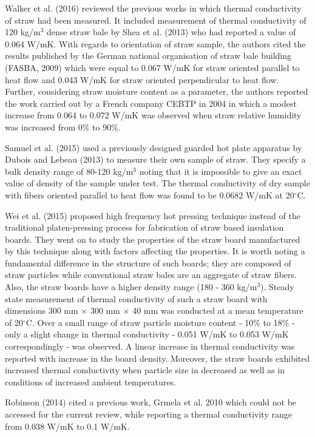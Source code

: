\documentclass[12pt]{report}
\begin{document}
 Walker et al. (2016) reviewed the previous works in which thermal
conductivity of straw had been measured. It included measurement of
thermal conductivity of 120 kg/m\(^{3}\) dense straw bale by Shea et al.
(2013) who had reported a value of 0.064 W/mK. With regards to
orientation of straw sample, the authors cited the results published by
the German national organisation of straw bale building (FASBA, 2009)
which were equal to 0.067 W/mK for straw oriented parallel to heat flow
and 0.043 W/mK for straw oriented perpendicular to heat flow. Further,
considering straw moisture content as a parameter, the authors reported
the work carried out by a French company CEBTP in 2004 in which a modest
increase from 0.064 to 0.072 W/mK was observed when straw relative
humidity was increased from 0\% to 90\%.

 Samuel et al. (2015) used a previously designed guarded hot plate
apparatus by Dubois and Lebeau (2013) to measure their own sample of
straw. They specify a bulk density range of 80-120 kg/m\(^{3}\) noting
that it is impossible to give an exact value of density of the sample
under test. The thermal conductivity of dry sample with fibers oriented
parallel to heat flow was found to be 0.0682 W/mK at 20\(^{\circ}\)C.

 Wei et al. (2015) proposed high frequency hot pressing technique
instead of the traditional platen-pressing process for fabrication of
straw based insulation boards. They went on to study the properties of
the straw board manufactured by this technique along with factors
affecting the properties. It is worth noting a fundamental difference in
the structure of such boards; they are composed of straw particles while
conventional straw bales are an aggregate of straw fibers. Also, the
straw boards have a higher density range (180 - 360 kg/m\(^{3}\)).
Steady state measurement of thermal conductivity of such a straw board
with dimensions 300 mm \(\times\) 300 mm \(\times\) 40 mm was conducted
at a mean temperature of 20\(^{\circ}\)C. Over a small range of straw
particle moisture content - 10\% to 18\% - only a slight change in
thermal conductivity - 0.051 W/mK to 0.053 W/mK correspondingly - was
observed. A linear increase in thermal conductivity was reported with
increase in the board density. Moreover, the straw boards exhibited
increased thermal conductivity when particle size in decreased as well
as in conditions of increased ambient temperatures.

 Robinson (2014) cited a previous work, Grmela et al. 2010 which could
not be accessed for the current review, while reporting a thermal
conductivity range from 0.038 W/mK to 0.1 W/mK.
\end{document}
